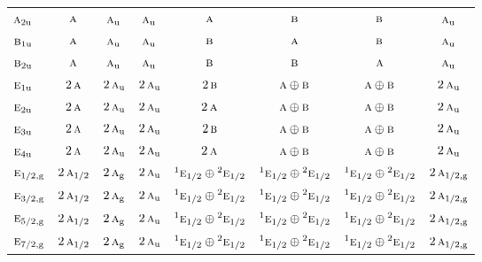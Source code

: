 \documentclass[10pt,a4paper]{article}
\numberwithin{equation}{section}
\newcommand{\irr}[1]{\text{\normalfont\scshape #1}}
\newcommand{\conjpair}[1]{{}^{#1}}
\newcommand{\ptag}[1]{\mathrm{#1}}
\begin{document}
{\begin{longtable}{@{}lccccccc@{}}
$\irr{a}_{2\ptag{u}}$ & $\irr{a}$ & $\irr{a}_{\ptag{u}}$ & $\irr{a}_{\ptag{u}}$ & $\irr{a}$ & $\irr{b}$ & $\irr{b}$ & $\irr{a}_{\ptag{u}}$\\
$\irr{b}_{1\ptag{u}}$ & $\irr{a}$ & $\irr{a}_{\ptag{u}}$ & $\irr{a}_{\ptag{u}}$ & $\irr{b}$ & $\irr{a}$ & $\irr{b}$ & $\irr{a}_{\ptag{u}}$\\
$\irr{b}_{2\ptag{u}}$ & $\irr{a}$ & $\irr{a}_{\ptag{u}}$ & $\irr{a}_{\ptag{u}}$ & $\irr{b}$ & $\irr{b}$ & $\irr{a}$ & $\irr{a}_{\ptag{u}}$\\
$\irr{e}_{1\ptag{u}}$ & $2\,\irr{a}$ & $2\,\irr{a}_{\ptag{u}}$ & $2\,\irr{a}_{\ptag{u}}$ & $2\,\irr{b}$ & $\irr{a}\oplus \irr{b}$ & $\irr{a}\oplus \irr{b}$ & $2\,\irr{a}_{\ptag{u}}$\\
$\irr{e}_{2\ptag{u}}$ & $2\,\irr{a}$ & $2\,\irr{a}_{\ptag{u}}$ & $2\,\irr{a}_{\ptag{u}}$ & $2\,\irr{a}$ & $\irr{a}\oplus \irr{b}$ & $\irr{a}\oplus \irr{b}$ & $2\,\irr{a}_{\ptag{u}}$\\
$\irr{e}_{3\ptag{u}}$ & $2\,\irr{a}$ & $2\,\irr{a}_{\ptag{u}}$ & $2\,\irr{a}_{\ptag{u}}$ & $2\,\irr{b}$ & $\irr{a}\oplus \irr{b}$ & $\irr{a}\oplus \irr{b}$ & $2\,\irr{a}_{\ptag{u}}$\\
$\irr{e}_{4\ptag{u}}$ & $2\,\irr{a}$ & $2\,\irr{a}_{\ptag{u}}$ & $2\,\irr{a}_{\ptag{u}}$ & $2\,\irr{a}$ & $\irr{a}\oplus \irr{b}$ & $\irr{a}\oplus \irr{b}$ & $2\,\irr{a}_{\ptag{u}}$\\
$\irr{e}_{1/2,\ptag{g}}$ & $2\,\irr{a}_{1/2}$ & $2\,\irr{a}_{\ptag{g}}$ & $2\,\irr{a}_{\ptag{u}}$ & $\conjpair{1}\irr{e}_{1/2}\oplus \conjpair{2}\irr{e}_{1/2}$ & $\conjpair{1}\irr{e}_{1/2}\oplus \conjpair{2}\irr{e}_{1/2}$ & $\conjpair{1}\irr{e}_{1/2}\oplus \conjpair{2}\irr{e}_{1/2}$ & $2\,\irr{a}_{1/2,\ptag{g}}$\\
$\irr{e}_{3/2,\ptag{g}}$ & $2\,\irr{a}_{1/2}$ & $2\,\irr{a}_{\ptag{g}}$ & $2\,\irr{a}_{\ptag{u}}$ & $\conjpair{1}\irr{e}_{1/2}\oplus \conjpair{2}\irr{e}_{1/2}$ & $\conjpair{1}\irr{e}_{1/2}\oplus \conjpair{2}\irr{e}_{1/2}$ & $\conjpair{1}\irr{e}_{1/2}\oplus \conjpair{2}\irr{e}_{1/2}$ & $2\,\irr{a}_{1/2,\ptag{g}}$\\
$\irr{e}_{5/2,\ptag{g}}$ & $2\,\irr{a}_{1/2}$ & $2\,\irr{a}_{\ptag{g}}$ & $2\,\irr{a}_{\ptag{u}}$ & $\conjpair{1}\irr{e}_{1/2}\oplus \conjpair{2}\irr{e}_{1/2}$ & $\conjpair{1}\irr{e}_{1/2}\oplus \conjpair{2}\irr{e}_{1/2}$ & $\conjpair{1}\irr{e}_{1/2}\oplus \conjpair{2}\irr{e}_{1/2}$ & $2\,\irr{a}_{1/2,\ptag{g}}$\\
$\irr{e}_{7/2,\ptag{g}}$ & $2\,\irr{a}_{1/2}$ & $2\,\irr{a}_{\ptag{g}}$ & $2\,\irr{a}_{\ptag{u}}$ & $\conjpair{1}\irr{e}_{1/2}\oplus \conjpair{2}\irr{e}_{1/2}$ & $\conjpair{1}\irr{e}_{1/2}\oplus \conjpair{2}\irr{e}_{1/2}$ & $\conjpair{1}\irr{e}_{1/2}\oplus \conjpair{2}\irr{e}_{1/2}$ & $2\,\irr{a}_{1/2,\ptag{g}}$\\

\end{longtable}}
\end{document}
